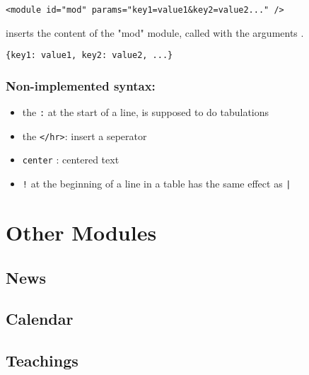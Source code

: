 \documentclass{article}
\begin{document}
\begin{itemize}
		       \verb|<module id="mod" params="key1=value1&key2=value2..." />| 
		       
		       inserts the content of the "mod" module, called with the
		       arguments  .
		  
		       \verb|{key1: value1, key2: value2, ...}|
		\end{itemize}
	
	\subsubsection{Non-implemented syntax:}	
	 \begin{itemize}
	 \item the \verb|:| at the start of a line, is supposed to do tabulations
\item the \verb|</hr>|: insert a seperator
\item \verb|center| : centered text
	\item \verb|!| at the beginning of a line in a table has the same effect as \verb?|?
	 \end{itemize}
	 \section{Other Modules}
	 \subsection{News}
	 \subsection{Calendar}
	 \subsection{Teachings}
\end{document}
